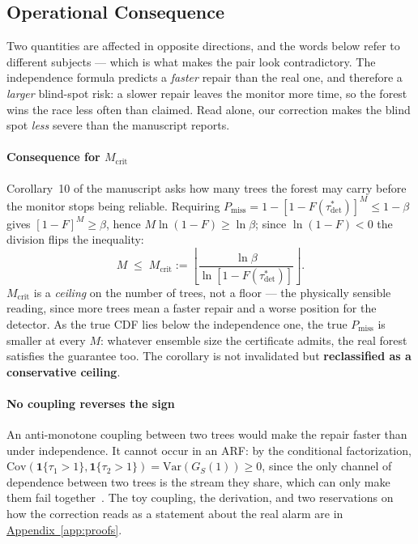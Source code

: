 \documentclass[10pt,conference]{IEEEtran}
\theoremstyle{definition}
\begin{document}
\subsection{Operational Consequence}

Two quantities are affected in opposite directions, and the words below refer to different
subjects --- which is what makes the pair look contradictory. The independence formula
predicts a \emph{faster} repair than the real one, and therefore a \emph{larger}
blind-spot risk: a slower repair leaves the monitor more time, so the forest wins the race
less often than claimed. Read alone, our correction makes the blind spot \emph{less} severe
than the manuscript reports.

\paragraph{Consequence for $M_{\mathrm{crit}}$} Corollary~10 of the manuscript asks how
many trees the forest may carry before the monitor stops being reliable. Requiring
$P_{\mathrm{miss}} = 1-[1-F(\tau^*_{\mathrm{det}})]^M \le 1-\beta$ gives $[1-F]^M \ge
\beta$, hence $M\ln(1-F) \ge \ln\beta$; since $\ln(1-F)<0$ the division flips the
inequality:
\[
  M \;\le\; M_{\mathrm{crit}} := \left\lfloor \frac{\ln\beta}{\ln[1-F(\tau^*_{\mathrm{det}})]} \right\rfloor .
\]
$M_{\mathrm{crit}}$ is a \emph{ceiling} on the number of trees, not a floor --- the
physically sensible reading, since more trees mean a faster repair and a worse position
for the detector. As the true CDF lies below the independence one, the true
$P_{\mathrm{miss}}$ is smaller at every $M$: whatever ensemble size the certificate
admits, the real forest satisfies the guarantee too. The corollary is not invalidated but
\textbf{reclassified as a conservative ceiling}.

\paragraph{No coupling reverses the sign} An anti-monotone coupling between two trees would
make the repair faster than under independence. It cannot occur in an ARF: by the
conditional factorization, $\mathrm{Cov}(\mathbf{1}\{\tau_1>1\}, \mathbf{1}\{\tau_2>1\}) =
\mathrm{Var}(G_S(1)) \ge 0$, since the only channel of dependence between two trees is the
stream they share, which can only make them fail together~\cite{esary1967}. The toy
coupling, the derivation, and two reservations on how the correction reads as a statement
about the real alarm are in \hyperref[app:proofs]{Appendix~\ref*{app:proofs}}.
\end{document}
